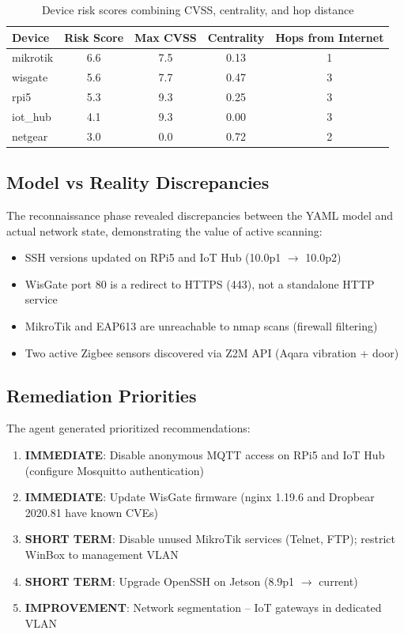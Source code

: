 \documentclass[11pt,a4paper]{article}
\begin{document}
\begin{table}[H]
\centering
\begin{tabular}{@{}lcccc@{}}
\toprule
\textbf{Device} & \textbf{Risk Score} & \textbf{Max CVSS} & \textbf{Centrality} & \textbf{Hops from Internet} \\
\midrule
mikrotik & 6.6 & 7.5 & 0.13 & 1 \\
wisgate & 5.6 & 7.7 & 0.47 & 3 \\
rpi5 & 5.3 & 9.3 & 0.25 & 3 \\
iot\_hub & 4.1 & 9.3 & 0.00 & 3 \\
netgear & 3.0 & 0.0 & 0.72 & 2 \\
\bottomrule
\end{tabular}
\caption{Device risk scores combining CVSS, centrality, and hop distance}
\label{tab:risk}
\end{table}

\subsection{Model vs Reality Discrepancies}

The reconnaissance phase revealed discrepancies between the YAML model and actual network state, demonstrating the value of active scanning:

\begin{itemize}
    \item SSH versions updated on RPi5 and IoT Hub (10.0p1 $\rightarrow$ 10.0p2)
    \item WisGate port 80 is a redirect to HTTPS (443), not a standalone HTTP service
    \item MikroTik and EAP613 are unreachable to nmap scans (firewall filtering)
    \item Two active Zigbee sensors discovered via Z2M API (Aqara vibration + door)
\end{itemize}

\subsection{Remediation Priorities}

The agent generated prioritized recommendations:

\begin{enumerate}
    \item \textbf{IMMEDIATE}: Disable anonymous MQTT access on RPi5 and IoT Hub (configure Mosquitto authentication)
    \item \textbf{IMMEDIATE}: Update WisGate firmware (nginx 1.19.6 and Dropbear 2020.81 have known CVEs)
    \item \textbf{SHORT TERM}: Disable unused MikroTik services (Telnet, FTP); restrict WinBox to management VLAN
    \item \textbf{SHORT TERM}: Upgrade OpenSSH on Jetson (8.9p1 $\rightarrow$ current)
    \item \textbf{IMPROVEMENT}: Network segmentation -- IoT gateways in dedicated VLAN
\end{enumerate}
\end{document}
